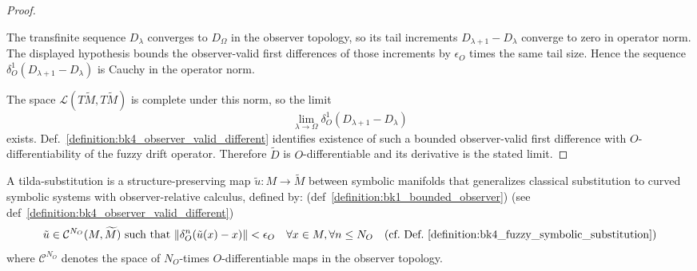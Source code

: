 \begin{proof}
\label{proof:bk4_convergence_of_symbolic_drift}
\leavevmode

The transfinite sequence $D_\lambda$ converges to $D_\Omega$ in the observer
topology, so its tail increments $D_{\lambda+1}-D_\lambda$ converge to zero in
operator norm. The displayed hypothesis bounds the observer-valid first
differences of those increments by $\epsilon_O$ times the same tail size. Hence
the sequence
$\delta^1_O(D_{\lambda+1}-D_\lambda)$ is Cauchy in the operator norm.

The space $\mathcal L(T\widetilde M,T\widetilde M)$ is complete under this
norm, so the limit
\[
\lim_{\lambda\to\Omega}\delta^1_O(D_{\lambda+1}-D_\lambda)
\]
exists. Def.~\ref{definition:bk4_observer_valid_different} identifies existence
of such a bounded observer-valid first difference with
$O$-differentiability of the fuzzy drift operator. Therefore
$\widetilde D$ is $O$-differentiable and its derivative is the stated limit.
\end{proof}
\begin{definition} \label{definition:bk4_tilda_substitution}
A tilda-substitution is a structure-preserving map $\tilde{u}: M \to \widetilde{M}$ between symbolic manifolds that generalizes classical substitution to curved symbolic systems with observer-relative calculus, defined by: (def~\ref{definition:bk1_bounded_observer}) (see def~\ref{definition:bk4_observer_valid_different})
\[
\tilde{u} \in \mathcal{C}^{N_O}(M, \widetilde{M}) \text{ such that } \|\delta^n_O(\tilde{u}(x) - x)\| < \epsilon_O \quad \forall x \in M, \forall n \leq N_O \quad (\text{cf.~Def.~\ref{definition:bk4_fuzzy_symbolic_substitution}})
\]
where $\mathcal{C}^{N_O}$ denotes the space of $N_O$-times $O$-differentiable maps in the observer topology.
\end{definition}
